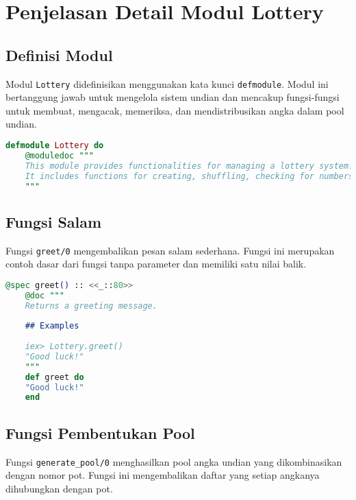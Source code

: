 \section{Penjelasan Detail Modul Lottery}

\subsection{Definisi Modul}

Modul \texttt{Lottery} didefinisikan menggunakan kata kunci \texttt{defmodule}. Modul ini bertanggung jawab untuk mengelola sistem undian dan mencakup fungsi-fungsi untuk membuat, mengacak, memeriksa, dan mendistribusikan angka dalam pool undian.

\begin{lstlisting}[language=elixir, caption={Definisi Modul Lottery}]
	defmodule Lottery do
	@moduledoc """
	This module provides functionalities for managing a lottery system.
	It includes functions for creating, shuffling, checking for numbers, and distributing numbers within the lottery pool.
	"""
\end{lstlisting}

\subsection{Fungsi Salam}

Fungsi \texttt{greet/0} mengembalikan pesan salam sederhana. Fungsi ini merupakan contoh dasar dari fungsi tanpa parameter dan memiliki satu nilai balik.

\begin{lstlisting}[language=elixir, caption={Fungsi Salam}]
	@spec greet() :: <<_::80>>
	@doc """
	Returns a greeting message.
	
	## Examples
	
	iex> Lottery.greet()
	"Good luck!"
	"""
	def greet do
	"Good luck!"
	end
\end{lstlisting}

\subsection{Fungsi Pembentukan Pool}

Fungsi \texttt{generate\_pool/0} menghasilkan pool angka undian yang dikombinasikan dengan nomor pot. Fungsi ini mengembalikan daftar yang setiap angkanya dihubungkan dengan pot.

